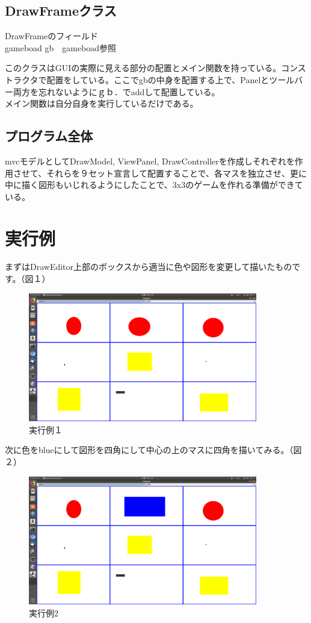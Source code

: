 \documentclass[12pt, a4paper, titlepage]{jsarticle}
\begin{document}
\subsection{DrawFrameクラス}
DrawFrameのフィールド\\
gameboad gb　gameboad参照

このクラスはGUIの実際に見える部分の配置とメイン関数を持っている。コンストラクタで配置をしている。ここでgbの中身を配置する上で、Panelとツールバー両方を忘れないようにｇｂ．でaddして配置している。\\
メイン関数は自分自身を実行しているだけである。

\subsection{プログラム全体}
mvcモデルとしてDrawModel, ViewPanel, DrawControllerを作成しそれぞれを作用させて、それらを９セット宣言して配置することで、各マスを独立させ、更に中に描く図形もいじれるようにしたことで、3x3のゲームを作れる準備ができている。


\section{実行例}
まずはDrawEditor上部のボックスから適当に色や図形を変更して描いたものです。（図１）

\begin{figure}[htbp]
 \begin{center}
 \includegraphics[width=10cm,clip]{kekka1.png}
 \end{center}
 \caption{実行例１}
\end{figure}

次に色をblueにして図形を四角にして中心の上のマスに四角を描いてみる。（図２）

\begin{figure}[htbp]
 \begin{center}
 \includegraphics[width=10cm,clip]{kekka2.png}
 \end{center}
 \caption{実行例2}
\end{figure}
\end{document}
